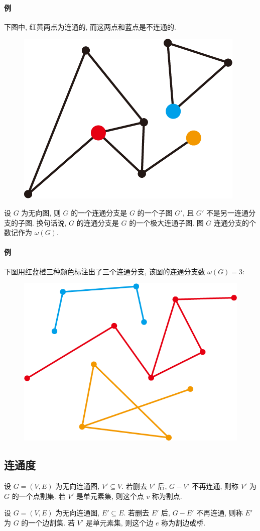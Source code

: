 \documentclass[UTF8]{ctexart}
\theoremstyle{mystyle}
\theoremstyle{myremark}
\theoremstyle{plain}
\begin{document}
\paragraph{例}
下图中, 红黄两点为连通的, 而这两点和蓝点是不连通的.
\begin{figure}[H]
    \centering
    \includegraphics[width = 0.25\linewidth]{./images/connected_1.png}
\end{figure}


\begin{definition}
    设 $ G $ 为无向图, 则 $ G $ 的一个连通分支是 $ G $ 的一个子图 $ G' $, 且 $ G' $ 不是另一连通分支的子图. 换句话说, $ G $ 的连通分支是 $ G $ 的一个极大连通子图. 图 $ G $ 连通分支的个数记作为 $ \omega(G) $.
\end{definition}

\paragraph{例}
下图用红蓝橙三种颜色标注出了三个连通分支, 该图的连通分支数 $ \omega(G) = 3 $:
\begin{figure}[H]
    \centering
    \includegraphics[width = 0.3\linewidth]{./images/branch.png}
\end{figure}



\subsection{连通度}
\begin{definition}
    设 $ G = (V, E) $ 为无向连通图, $ V' \subseteq V $. 若删去 $ V' $ 后, $ G - V' $ 不再连通, 则称 $ V' $ 为 $ G $ 的一个点割集. 若 $ V' $ 是单元素集, 则这个点 $ v $ 称为割点.
\end{definition}

\begin{definition}
    设 $ G = (V, E) $ 为无向连通图, $ E' \subseteq E $. 若删去 $ E' $ 后, $ G - E' $ 不再连通, 则称 $ E' $ 为 $ G $ 的一个边割集. 若 $ V' $ 是单元素集, 则这个边 $ e $ 称为割边或桥.
\end{definition}
\end{document}
